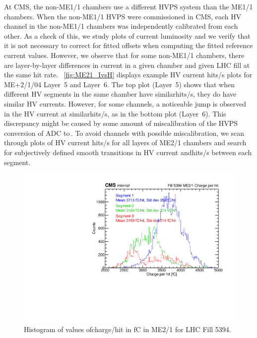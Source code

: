 At CMS, the non-ME1/1 chambers use a different HVPS system than the ME1/1 chambers. When the non-ME1/1 HVPS were commissioned in CMS, each HV channel in the non-ME1/1 chambers was independently calibrated from each other. As a check of this, we study plots of current \vs luminosity and we verify that it is not necessary to correct for fitted offsets when computing the fitted reference current values. However, we observe that for some non-ME1/1 chambers, there are layer-by-layer differences in current in a given chamber and given LHC fill at the same hit rate. \Fig~\ref{fig:ME21_IvsH} displays example HV current \vs \unit{hits/s} plots for ME+2/1/04 Layer~5 and Layer~6. The top plot (Layer~5) shows that when different HV segments in the same chamber have similar\unit{hits/s}, they do have similar HV currents. However, for some channels, a noticeable jump is observed in the HV current at similar\unit{hits/s}, as in the bottom plot (Layer~6). This discrepancy might be caused by some amount of miscalibration of the HVPS conversion of ADC to$\,$\muA. To avoid channels with possible miscalibration, we scan through plots of HV current \vs\unit{hits/s} for all layers of ME2/1 chambers and search for subjectively defined smooth transitions in HV current and\unit{hits/s} between each segment. 

\begin{figure}
	\centering
	\includegraphics[width=\dummyFigWidth]{figures/neutron/ME21_f5394_chph_sel_hist.pdf}
	\caption{Histogram of values of\unit{charge/hit} in fC in ME2/1 for LHC Fill 5394.}
	\label{fig:ME21_fill_5394_chph_histo}
\end{figure}

